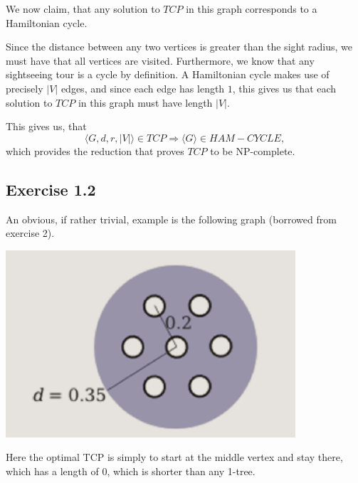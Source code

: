 \documentclass[11pt,a4paper]{article}
\begin{document}
We now claim, that any solution to $TCP$ in this graph corresponds to a Hamiltonian cycle.

Since the distance between any two vertices is greater than the sight radius, we must have that
all vertices are visited. Furthermore, we know that any sightseeing tour is a cycle by definition.
A Hamiltonian cycle makes use of precisely $|V|$ edges, and since each edge has length $1$, this gives
us that each solution to $TCP$ in this graph must have length $|V|$.

This gives us, that
\[
    \langle G, d, r, |V| \rangle \in TCP \Rightarrow \langle G \rangle \in HAM-CYCLE,
\]
which provides the reduction that proves $TCP$ to be NP-complete.

\subsection{Exercise 1.2}
An obvious, if rather trivial, example is the following graph (borrowed from exercise 2).

\includegraphics[width=\textwidth]{tcp.png}

Here the optimal TCP is simply to start at the middle vertex and stay there, which has a length of 0, which is shorter than any 1-tree.
\end{document}

